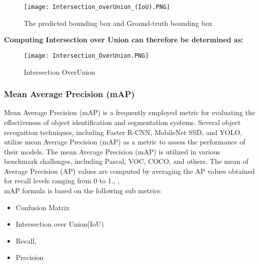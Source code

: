 \begin{figure}[H]
    \centering
    \texttt{[image: Intersection\_overUnion\_(IoU).PNG]}
    \caption{The predicted bounding box and Ground-truth bounding box \cite{ansari2020building}}
    \label{fig:PBGTB}
\end{figure}

\textbf{Computing Intersection over Union can therefore be determined as:}\\

\begin{figure}[H]
    \centering
    \texttt{[image: Intersection\_OverUnion.PNG]}
    \caption{Intersection OverUnion}
    \label{fig:Intersection_OverUnion}
\end{figure}

\subsubsection{Mean Average Precision (mAP)}
Mean Average Precision (mAP) is a frequently employed metric for evaluating the effectiveness of object identification and segmentation systems. Several object recognition techniques, including Faster R-CNN, MobileNet SSD, and YOLO, utilize mean Average Precision (mAP) as a metric to assess the performance of their models. The mean Average Precision (mAP) is utilized in various benchmark challenges, including Pascal, VOC, COCO, and others. The mean of Average Precision (AP) values are computed by averaging the AP values obtained for recall levels ranging from 0 to 1.\cite{padilla2020survey}, \cite{ansari2020building},  \\
mAP formula is based on the following sub metrics:
\begin{itemize}
    \item Confusion Matrix
    \item Intersection over Union(IoU)
    \item Recall,
    \item Precision
\end{itemize}

